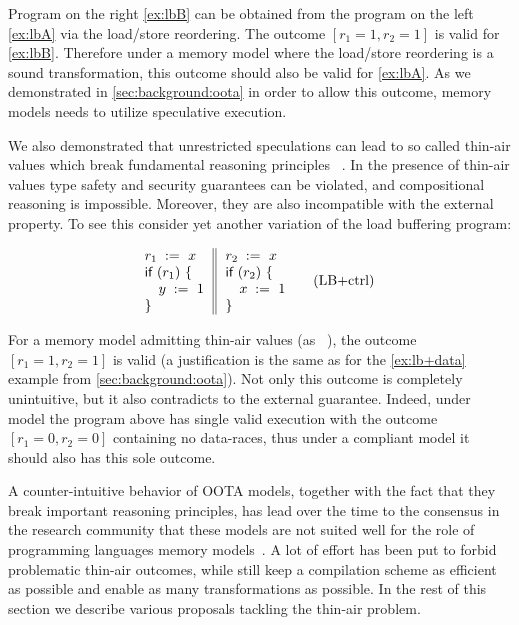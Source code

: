 Program on the right \ref{ex:lbB} can be obtained 
from the program on the left \ref{ex:lbA}
via the load/store reordering.
The outcome ${[r_1=1, r_2=1]}$ is valid for \ref{ex:lbB}.
Therefore under a memory model where the load/store reordering 
is a sound transformation, 
this outcome should also be valid for \ref{ex:lbA}.
As we demonstrated in \cref{sec:background:oota}
in order to allow this outcome, 
memory models needs to utilize speculative execution.

We also demonstrated that unrestricted speculations 
can lead to so called thin-air values which 
break fundamental reasoning principles~%
\cite{Boehm-Demsky:MSPC14, Batty-al:ESOP15}.
In the presence of thin-air values
type safety and security guarantees can be violated, 
and compositional reasoning is impossible.
Moreover, they are also incompatible with 
the external \DRF property.
To see this consider yet another variation of 
the load buffering program:

\begin{equation*}
\inarrII{
  \readInst{}{r_1}{x}      \\
  \kw{if} {(r_1)} ~\{      \\
  \quad\writeInst{}{y}{1}  \\
  \}
}{
  \readInst{}{r_2}{x}      \\
  \kw{if} {(r_2)} ~\{      \\
  \quad\writeInst{}{x}{1}  \\
  \}
}
\tag{LB+ctrl}\label{ex:lb+ctrl}
\end{equation*}

For a memory model admitting thin-air values 
(as \eg \CMM~\cite{Batty-al:POPL11}), 
the outcome ${[r_1=1, r_2=1]}$ is valid
(a justification is the same as for 
the \ref{ex:lb+data} example from \cref{sec:background:oota}).
Not only this outcome is completely unintuitive,
but it also contradicts to the external \DRF guarantee.
Indeed, under \SC model the program above has 
single valid execution with the outcome $[r_1=0, r_2=0]$ 
containing no data-races, thus under a \DRF compliant model 
it should also has this sole outcome.  

A counter-intuitive behavior of OOTA models, 
together with the fact that they break 
important reasoning principles,
has lead over the time to the consensus 
in the research community that these models 
are not suited well for the role of 
programming languages memory models~\cite{Boehm-Demsky:MSPC14, Batty-al:ESOP15}.
A lot of effort has been put to forbid problematic 
thin-air outcomes, while still keep a 
compilation scheme as efficient as possible
and enable as many transformations as possible.
In the rest of this section we describe various proposals 
tackling the thin-air problem. 

